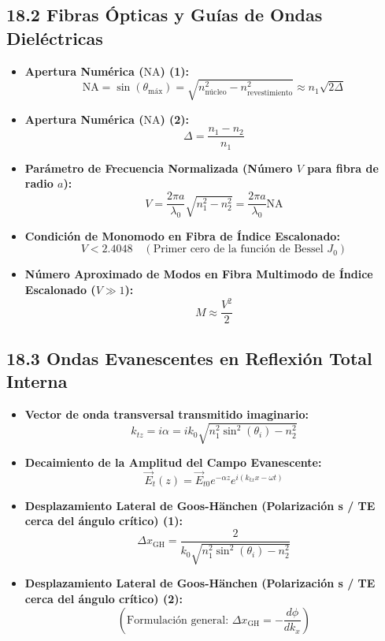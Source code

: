\documentclass[11pt,a4paper]{article}
\begin{document}
\subsection*{18.2 Fibras Ópticas y Guías de Ondas Dieléctricas}

\begin{itemize}
  \item \textbf{Apertura Numérica ($\mathrm{NA}$) (1):}
  \[
    \mathrm{NA} = \sin(\theta_{\mathrm{máx}}) = \sqrt{n_{\text{núcleo}}^2 - n_{\text{revestimiento}}^2} \approx n_1 \sqrt{2\Delta}
  \]
  \item \textbf{Apertura Numérica ($\mathrm{NA}$) (2):}
  \[
    \Delta = \frac{n_1 - n_2}{n_1}
  \]
  \item \textbf{Parámetro de Frecuencia Normalizada (Número $V$ para fibra de radio $a$):}
  \[
    V = \frac{2\pi a}{\lambda_0} \sqrt{n_1^2 - n_2^2} = \frac{2\pi a}{\lambda_0} \mathrm{NA}
  \]
  \item \textbf{Condición de Monomodo en Fibra de Índice Escalonado:}
  \[
    V < 2.4048 \quad (\text{Primer cero de la función de Bessel } J_0)
  \]
  \item \textbf{Número Aproximado de Modos en Fibra Multimodo de Índice Escalonado ($V \gg 1$):}
  \[
    M \approx \frac{V^2}{2}
  \]
\end{itemize}

\subsection*{18.3 Ondas Evanescentes en Reflexión Total Interna}

\begin{itemize}
  \item \textbf{Vector de onda transversal transmitido imaginario:}
  \[
    k_{tz} = i \alpha = i k_0 \sqrt{n_1^2 \sin^2(\theta_i) - n_2^2}
  \]
  \item \textbf{Decaimiento de la Amplitud del Campo Evanescente:}
  \[
    \vec{E}_t(z) = \vec{E}_{t0} e^{-\alpha z} e^{i(k_{tx} x - \omega t)}
  \]
  \item \textbf{Desplazamiento Lateral de Goos-Hänchen (Polarización s / TE cerca del ángulo crítico) (1):}
  \[
    \Delta x_{\mathrm{GH}} = \frac{2}{k_0 \sqrt{n_1^2 \sin^2(\theta_i) - n_2^2}}
  \]
  \item \textbf{Desplazamiento Lateral de Goos-Hänchen (Polarización s / TE cerca del ángulo crítico) (2):}
  \[
    \left( \text{Formulación general: } \Delta x_{\mathrm{GH}} = -\frac{d\phi}{dk_x} \right)
  \]
\end{itemize}
\end{document}
